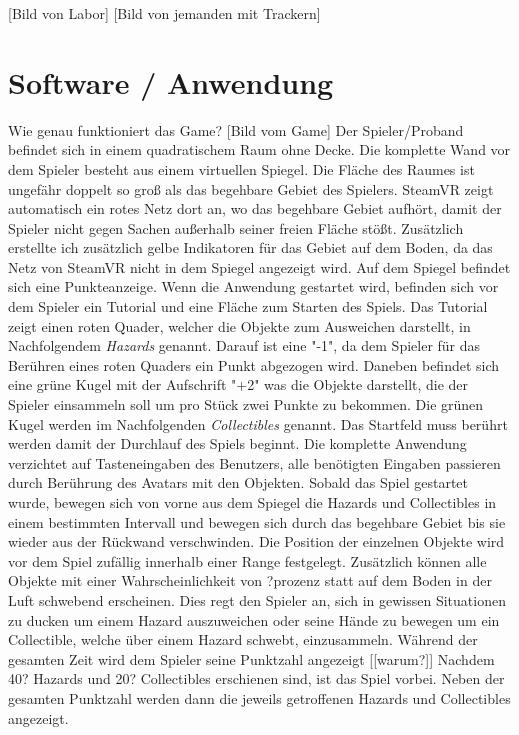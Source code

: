 [Bild von Labor] [Bild von jemanden mit Trackern]

\section{Software / Anwendung}
Wie genau funktioniert das Game?
[Bild vom Game]
Der Spieler/Proband befindet sich in einem quadratischem Raum ohne Decke. Die komplette Wand vor dem Spieler besteht aus einem virtuellen Spiegel. Die Fläche des Raumes ist ungefähr doppelt so groß als das begehbare Gebiet des Spielers. SteamVR zeigt automatisch ein rotes Netz dort an, wo das begehbare Gebiet aufhört, damit der Spieler nicht gegen Sachen außerhalb seiner freien Fläche stößt. Zusätzlich erstellte ich zusätzlich gelbe Indikatoren für das Gebiet auf dem Boden, da das Netz von SteamVR nicht in dem Spiegel angezeigt wird. Auf dem Spiegel befindet sich eine Punkteanzeige.
Wenn die Anwendung gestartet wird, befinden sich vor dem Spieler ein Tutorial und eine Fläche zum Starten des Spiels. Das Tutorial zeigt einen roten Quader, welcher die Objekte zum Ausweichen darstellt, in Nachfolgendem \textit{Hazards} genannt. Darauf ist eine "-1", da dem Spieler für das Berühren eines roten Quaders ein Punkt abgezogen wird. Daneben befindet sich eine grüne Kugel mit der Aufschrift "+2" was die Objekte darstellt, die der Spieler einsammeln soll um pro Stück zwei Punkte zu bekommen. Die grünen Kugel werden im Nachfolgenden \textit{Collectibles} genannt.
Das Startfeld muss berührt werden damit der Durchlauf des Spiels beginnt. Die komplette Anwendung verzichtet auf Tasteneingaben des Benutzers, alle benötigten Eingaben passieren durch Berührung des Avatars mit den Objekten.
Sobald das Spiel gestartet wurde, bewegen sich von vorne aus dem Spiegel die Hazards und Collectibles in einem bestimmten Intervall und bewegen sich durch das begehbare Gebiet bis sie wieder aus der Rückwand verschwinden. Die Position der einzelnen Objekte wird vor dem Spiel zufällig innerhalb einer Range festgelegt. Zusätzlich können alle Objekte mit einer Wahrscheinlichkeit von ?prozenz statt auf dem Boden in der Luft schwebend erscheinen. Dies regt den Spieler an, sich in gewissen Situationen zu ducken um einem Hazard auszuweichen oder seine Hände zu bewegen um ein Collectible, welche über einem Hazard schwebt, einzusammeln. Während der gesamten Zeit wird dem Spieler seine Punktzahl angezeigt [[warum?]] Nachdem 40? Hazards und 20? Collectibles erschienen sind, ist das Spiel vorbei. Neben der gesamten Punktzahl werden dann die jeweils getroffenen Hazards und Collectibles angezeigt. 

